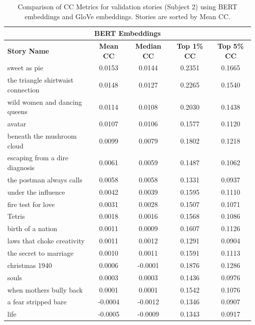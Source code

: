\documentclass{article}
\begin{document}
\begin{table}[H] 
  \centering
  \caption{Comparison of CC Metrics for validation stories (Subject 2) using BERT embeddings and GloVe embeddings. Stories are sorted by Mean CC.}
  \label{tab:story_cc_metrics_comparison}
  \begin{tabular}{lcccc}
    \hline
    \multicolumn{5}{c}{\textbf{BERT Embeddings}} \\
    \hline
    \textbf{Story Name} & \textbf{Mean CC} & \textbf{Median CC} & \textbf{Top 1\% CC} & \textbf{Top 5\% CC} \\
    \hline
    sweet as pie                  & 0.0153 & 0.0144 & 0.2351 & 0.1665 \\
    the triangle shirtwaist connection & 0.0148 & 0.0127 & 0.2265 & 0.1540 \\
    wild women and dancing queens & 0.0114 & 0.0108 & 0.2030 & 0.1438 \\
    avatar                      & 0.0107 & 0.0106 & 0.1577 & 0.1120 \\
    beneath the mushroom cloud  & 0.0099 & 0.0079 & 0.1802 & 0.1218 \\
    escaping from a dire diagnosis & 0.0061 & 0.0059 & 0.1487 & 0.1062 \\
    the postman always calls    & 0.0058 & 0.0058 & 0.1331 & 0.0937 \\
    under the influence         & 0.0042 & 0.0039 & 0.1595 & 0.1110 \\
    fire test for love          & 0.0031 & 0.0028 & 0.1507 & 0.1071 \\
    Tetris                      & 0.0018 & 0.0016 & 0.1568 & 0.1086 \\
    birth of a nation           & 0.0011 & 0.0009 & 0.1607 & 0.1126 \\
    laws that choke creativity  & 0.0011 & 0.0012 & 0.1291 & 0.0904 \\
    the secret to marriage      & 0.0010 & 0.0011 & 0.1591 & 0.1113 \\
    christmas 1940              & 0.0006 & -0.0001 & 0.1876 & 0.1286 \\
    souls                       & 0.0003 & 0.0003 & 0.1436 & 0.0976 \\
    when mothers bully back     & 0.0001 & 0.0001 & 0.1542 & 0.1076 \\
    a fear stripped bare        & -0.0004 & -0.0012 & 0.1346 & 0.0907 \\
    life                        & -0.0005 & -0.0009 & 0.1343 & 0.0917 \\

\end{tabular}
\end{table}
\end{document}
